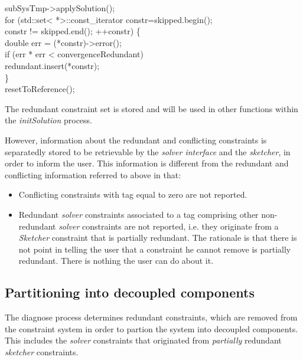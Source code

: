 \documentclass[12pt,twoside,a4paper]{book}
\begin{document}
    \begin{codequote}
    subSysTmp-\textgreater{}applySolution();\\
    for (std::set\textless{} *\textgreater{}::const\_iterator constr=skipped.begin();\\
    \-\hspace{1.5cm}constr != skipped.end(); ++constr) \{\\
    \-\hspace{0.5cm}double err = (*constr)-\textgreater{}error();\\
    \-\hspace{0.5cm}if (err * err \textless{} convergenceRedundant)\\
    \-\hspace{1cm}redundant.insert(*constr);\\
    \}\\
    resetToReference();
    \end{codequote}

    The redundant constraint set is stored and will be used in other functions within the \emph{initSolution} process.

    However, information about the redundant and conflicting constraints is separatedly stored to be retrievable by the \emph{solver interface} and the \emph{sketcher}, in order to inform the user. This information is different from the redundant and conflicting information referred to above in that:

    \begin{itemize}
     \item Conflicting constraints with tag equal to zero are not reported.
     \item Redundant \emph{solver} constraints associated to a tag comprising other non-redundant \emph{solver} constraints are not reported, i.e. they originate from a \emph{Sketcher} constraint that is partially redundant. The rationale is that there is not point in telling the user that a constraint he cannot remove is partially redundant. There is nothing the user can do about it.
    \end{itemize}

    \subsection{Partitioning into decoupled components}

    The diagnose process determines redundant constraints, which are removed from the constraint system in order to partion the system into decoupled components. This includes the \emph{solver} constraints that originated from \emph{partially} redundant \emph{sketcher} constraints.
\end{document}
